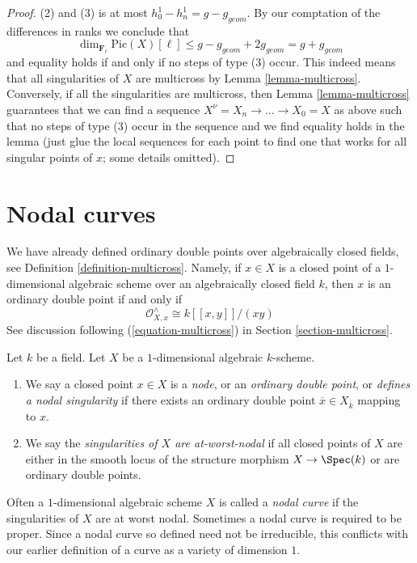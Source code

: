 \begin{proof}
(2) and (3) is at most $h^1_0 - h^1_n = g - g_{geom}$.
By our comptation of the differences in ranks we conclude that
$$
\dim_{\mathbf{F}_\ell} \text{Pic}(X)[\ell] \leq
g - g_{geom} + 2g_{geom} = g + g_{geom}
$$
and equality holds if and only if no steps of type (3) occur.
This indeed means that all singularities of $X$ are multicross
by Lemma \ref{lemma-multicross}. Conversely, if all the singularities
are multicross, then Lemma \ref{lemma-multicross} guarantees that
we can find a sequence $X^\nu = X_n \to \ldots \to X_0 = X$
as above such that no steps of type (3) occur in the sequence
and we find equality holds in the lemma (just glue the local sequences
for each point to find one that works for all singular points of $x$;
some details omitted).
\end{proof}


\section{Nodal curves}
\label{section-nodal}

\noindent
We have already defined ordinary double points over algebraically
closed fields, see Definition \ref{definition-multicross}. Namely,
if $x \in X$ is a closed point of a $1$-dimensional
algebraic scheme over an algebraically closed field $k$, then
$x$ is an ordinary double point if and only if
$$
\mathcal{O}_{X, x}^\wedge \cong k[[x, y]]/(xy)
$$
See discussion following (\ref{equation-multicross}) in
Section \ref{section-multicross}.

\begin{definition}
\label{definition-nodal}
Let $k$ be a field. Let $X$ be a $1$-dimensional algebraic $k$-scheme.
\begin{enumerate}
\item We say a closed point $x \in X$ is a {\it node}, or an
{\it ordinary double point}, or {\it defines a nodal singularity}
if there exists an ordinary double point $\overline{x} \in X_{\overline{k}}$
mapping to $x$.
\item We say the {\it singularities of $X$ are at-worst-nodal} if
all closed points of $X$ are either in the smooth locus of
the structure morphism $X \to \Spec(k)$ or are ordinary double points.
\end{enumerate}
\end{definition}

\noindent
Often a $1$-dimensional algebraic scheme $X$ is called a {\it nodal curve}
if the singularities of $X$ are at worst nodal. Sometimes a nodal curve
is required to be proper. Since a nodal curve
so defined need not be irreducible, this conflicts with our earlier definition
of a curve as a variety of dimension $1$.

